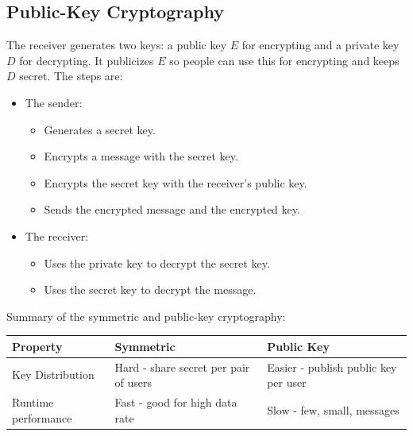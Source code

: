 \documentclass[twoside]{article}
\begin{document}
\subsection{Public-Key Cryptography}
The receiver generates two keys: a public key \(E\) for encrypting and a private
key \(D\) for decrypting. It publicizes \(E\) so people can use this for
encrypting and keeps \(D\) secret. The steps are:
\begin{itemize}
    \item The sender:
    \begin{itemize}
        \item Generates a secret key.
        \item Encrypts a message with the secret key.
        \item Encrypts the secret key with the receiver's public key.
        \item Sends the encrypted message and the encrypted key.
    \end{itemize}
    \item The receiver:
    \begin{itemize}
        \item Uses the private key to decrypt the secret key.
        \item Uses the secret key to decrypt the message.
    \end{itemize}
\end{itemize}
Summary of the symmetric and public-key cryptography:
\begin{center}
    \begin{tabular}{| l | l | l |}
    \hline \textbf{Property} & \textbf{Symmetric} & \textbf{Public Key} \\ \hline
    \hline Key Distribution & Hard - share secret per pair of users & Easier - publish public key per user \\ \hline
    \hline Runtime performance & Fast - good for high data rate & Slow - few, small, messages \\ \hline
    \end{tabular}
\end{center}
\end{document}
